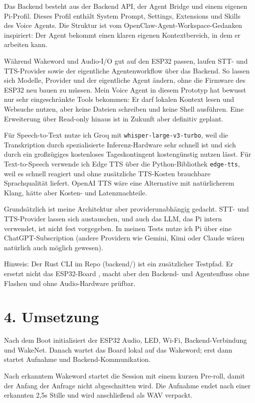 \documentclass[11pt,a4paper]{article}
\begin{document}
Das Backend besteht aus der Backend API, der Agent Bridge und einem eigenen Pi-Profil. Dieses Profil enthält System Prompt, Settings, Extensions und Skills des Voice Agents. Die Struktur ist vom OpenClaw-Agent-Workspace-Gedanken inspiriert: Der Agent bekommt einen klaren eigenen Kontextbereich, in dem er arbeiten kann.


Während Wakeword und Audio-I/O gut auf den ESP32 passen, laufen STT- und TTS-Provider sowie der eigentliche Agentenworkflow über das Backend. So lassen sich Modelle, Provider und der eigentliche Agent ändern, ohne die Firmware des ESP32 neu bauen zu müssen. Mein Voice Agent in diesem Prototyp hat bewusst nur sehr eingeschränkte Tools bekommen: Er darf lokalen Kontext lesen und Websuche nutzen, aber keine Dateien schreiben und keine Shell ausführen. Eine Erweiterung über Read-only hinaus ist in Zukunft aber definitiv geplant.

Für Speech-to-Text nutze ich Groq mit \texttt{whisper-large-v3-turbo}, weil die Transkription durch spezialisierte Inferenz-Hardware sehr schnell ist und sich durch ein großzügiges kostenloses Tageskontingent kostengünstig nutzen lässt. Für Text-to-Speech verwende ich Edge TTS über die Python-Bibliothek \texttt{edge-tts}, weil es schnell reagiert und ohne zusätzliche TTS-Kosten brauchbare Sprachqualität liefert. OpenAI TTS wäre eine Alternative mit natürlicherem Klang, hätte aber Kosten- und Latenznachteile.

Grundsätzlich ist meine Architektur aber providerunabhängig gedacht. STT- und TTS-Provider lassen sich austauschen, und auch das LLM, das Pi intern verwendet, ist nicht fest vorgegeben. In meinen Tests nutze ich Pi über eine ChatGPT-Subscription (andere Providern wie Gemini, Kimi oder Claude wären natürlich auch möglich gewesen).



Hinweis: Der Rust CLI im Repo (backend/) ist ein zusätzlicher Testpfad. Er ersetzt nicht das ESP32-Board , macht aber den Backend- und Agentenfluss ohne Flashen und ohne Audio-Hardware prüfbar.

\section*{4. Umsetzung}

Nach dem Boot initialisiert der ESP32 Audio, LED, Wi-Fi, Backend-Verbindung und WakeNet. Danach wartet das Board lokal auf das Wakeword; erst dann startet Aufnahme und Backend-Kommunikation.

Nach erkanntem Wakeword startet die Session mit einem kurzen Pre-roll, damit der Anfang der Anfrage nicht abgeschnitten wird. Die Aufnahme endet nach einer erkannten 2,5s Stille und wird anschließend als WAV verpackt.
\end{document}
